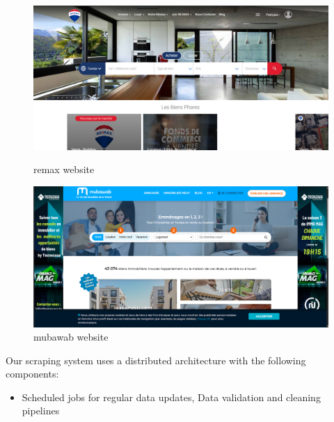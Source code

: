 \begin{figure}[htbp]
    \vspace{0.75cm}
    
    \begin{minipage}{0.47\textwidth}
        \centering
        \includegraphics[width=\linewidth]{images/remax.png}
        \caption{remax website}
        \label{fig:remax-website}
    \end{minipage}
    \hfill
    \begin{minipage}{0.47\textwidth}
        \centering
        \includegraphics[width=\linewidth]{images/mub.png}
        \caption{mubawab website}
        \label{fig:mubawab-website}
    \end{minipage}
\end{figure}

Our scraping system uses a distributed architecture with the following components:
\begin{itemize}
    \item Scheduled jobs for regular data updates, Data validation and cleaning pipelines
\end{itemize}

